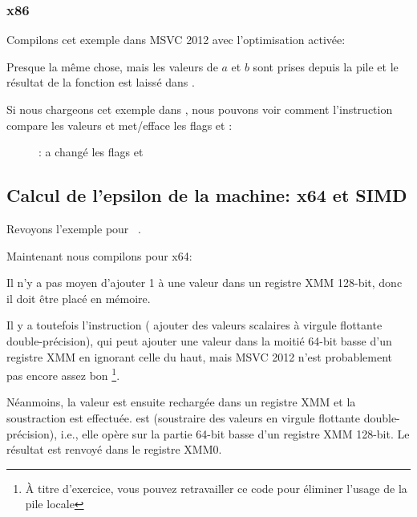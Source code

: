 \clearpage
\subsubsection{x86}

Compilons cet exemple dans MSVC 2012 avec l'optimisation activée:



Presque la même chose, mais les valeurs de $a$ et $b$ sont prises depuis la pile
et le résultat de la fonction est laissé dans .

Si nous chargeons cet exemple dans \olly, nous pouvons voir comment l'instruction
 compare les valeurs et met/efface les flags \CF et \PF:

\begin{figure}[H]
\centering
{}
\caption{\olly:  a changé les flags \CF et \PF}
\label{fig:FPU_SIMD_d_max_olly}
\end{figure}

\subsection{Calcul de l'epsilon de la machine: x64 et SIMD}
\label{machine_epsilon_x64_and_SIMD}

Revoyons l'exemple  pour \Tdouble\ .

Maintenant nous compilons pour x64:



Il n'y a pas moyen d'ajouter 1 à une valeur dans un registre XMM 128-bit, donc il
doit être placé en mémoire.

Il y a toutefois l'instruction  ( ajouter des valeurs scalaires à virgule flottante double-précision), qui
peut ajouter une valeur dans la moitié 64-bit basse d'un registre XMM en ignorant
celle du haut, mais MSVC 2012 n'est probablement pas encore assez bon \footnote{À
titre d'exercice, vous pouvez retravailler ce code pour éliminer l'usage de la pile
locale}.

Néanmoins, la valeur est ensuite rechargée dans un registre XMM et la soustraction
est effectuée.
 est  (soustraire
des valeurs en virgule flottante double-précision), i.e., elle opère sur la partie
64-bit basse d'un registre XMM 128-bit.
Le résultat est renvoyé dans le registre XMM0.

